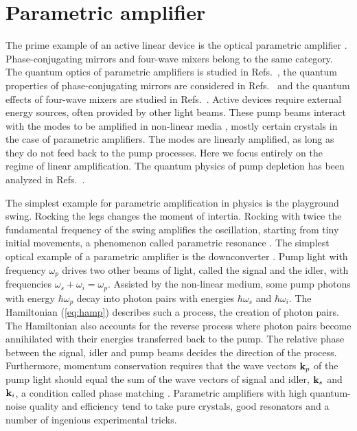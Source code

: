\documentclass[12pt,amsmath,amssymb]{article}
\numberwithin{equation}{section}
\begin{document}
\section{Parametric amplifier}

The prime example of an active linear device is the optical
parametric amplifier \cite{Shen}. Phase-conjugating mirrors
\cite{Shen} and four-wave mixers \cite{Shen} belong to the same category.
The quantum optics of parametric amplifiers is studied in Refs.\
\cite{Caves,Huttner2,JIL,LeyLoudon,MG1,MG2,PaulFS,Townsend,YMK},
the quantum properties of phase-conjugating mirrors are considered in Refs.\
\cite{Agarwal1,Agarwal2,BAH,Gaeta,OBM} and the quantum
effects of four-wave mixers are studied in Refs.\
\cite{Kumar,ReidWalls,YS,Yurke}.
Active devices require external energy sources, often
provided by other light beams. These pump beams interact with the
modes to be amplified in non-linear media \cite{Bloembergen,Shen},
mostly certain crystals in the case of parametric amplifiers. The modes
are linearly amplified, as long as they do not feed back to the
pump processes. Here we focus entirely on the regime of linear
amplification. The  quantum physics of pump depletion has been
analyzed in Refs.\ \cite{Bandilla1,Bandilla2}.

The simplest example for parametric amplification in physics is
the playground swing. Rocking the legs changes the moment of
intertia. Rocking with twice the fundamental frequency of the
swing amplifies the oscillation, starting from tiny initial
movements, a phenomenon called parametric resonance \cite{LL1}.
The simplest optical example of a parametric amplifier is the
downconverter \cite{MandelWolf}.
Pump light with frequency $\omega_p$ drives two
other beams of light, called the signal and the idler, with
frequencies $\omega_s+\omega_i=\omega_p$. Assisted by the
non-linear medium, some pump photons with energy $\hbar\omega_p$
decay into photon pairs with energies $\hbar\omega_s$ and
$\hbar\omega_i$. The Hamiltonian (\ref{eq:hamp}) describes such a
process, the creation of photon pairs. The Hamiltonian also
accounts for the reverse process where photon pairs become
annihilated with their energies transferred back to the pump. The
relative phase between the signal, idler and pump beams decides
the direction of the process. Furthermore, momentum conservation
requires that the wave vectors ${\bf k}_p$ of the pump light
should equal the sum of the wave vectors of signal and idler,
${\bf k}_s$ and ${\bf k}_i$, a condition called phase matching
\cite{Shen}. Parametric amplifiers with high quantum-noise quality
and efficiency tend to take pure crystals, good resonators and a
number of ingenious experimental tricks.
\end{document}
